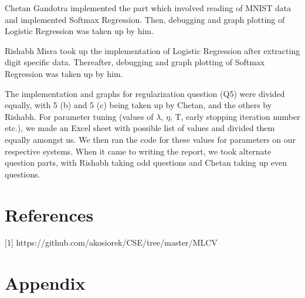 \documentclass{article}
\begin{document}
Chetan Gandotra implemented the part which involved reading of MNIST data and implemented Softmax Regression. Then, debugging and graph plotting of Logistic Regression was taken up by him.

Rishabh Misra took up the implementation of Logistic Regression after extracting digit specific data. Thereafter, debugging and graph plotting of Softmax Regression was taken up by him.

The implementation and graphs for regularization question (Q5) were divided equally, with 5 (b) and 5 (c) being taken up by Chetan, and the others by Rishabh. For parameter tuning (values of $\lambda$, $\eta$, T, early stopping iteration number etc.), we made an Excel sheet with possible list of values and divided them equally amongst us. We then ran the code for these values for parameters on our respective systems.
When it came to writing the report, we took alternate question parts, with Rishabh taking odd questions and Chetan taking up even questions.

\newpage
\section*{References}

\small

[1] https://github.com/akosiorek/CSE/tree/master/MLCV

\section*{Appendix}
\end{document}
